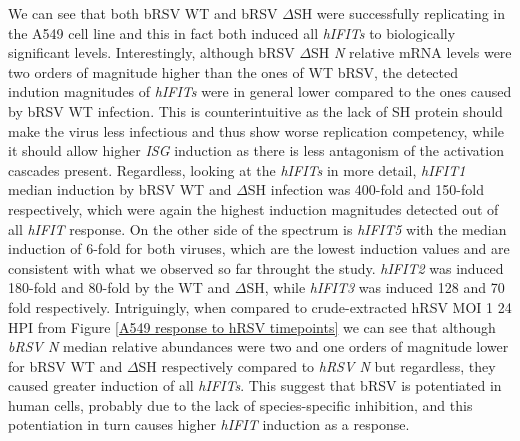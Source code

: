 We can see that both bRSV WT and bRSV \(\Delta\)SH were successfully replicating in the A549 cell line and this in fact both induced all \textit{hIFITs} to biologically significant levels. Interestingly, although bRSV \(\Delta\)SH \textit{N} relative mRNA levels were two orders of magnitude higher than the ones of WT bRSV, the detected indution magnitudes of \textit{hIFITs} were in general lower compared to the ones caused by bRSV WT infection. This is counterintuitive as the lack of SH protein should make the virus less infectious and thus show worse replication competency, while it should allow higher \textit{ISG} induction as there is less antagonism of the activation cascades present. Regardless, looking at the \textit{hIFITs} in more detail, \textit{hIFIT1} median induction by bRSV WT and \(\Delta\)SH infection was 400-fold and 150-fold respectively, which were again the highest induction magnitudes detected out of all \textit{hIFIT} response. On the other side of the spectrum is \textit{hIFIT5} with the median induction of 6-fold for both viruses, which are the lowest induction values and are consistent with what we observed so far throught the study. \textit{hIFIT2} was induced 180-fold and 80-fold by the WT and \(\Delta\)SH, while \textit{hIFIT3} was induced 128 and 70 fold respectively. Intriguingly, when compared to crude-extracted hRSV MOI 1 24 HPI from Figure \ref{A549 response to hRSV timepoints} we can see that although \textit{bRSV N} median relative abundances were two and one orders of magnitude lower for bRSV WT and \(\Delta\)SH respectively compared to \textit{hRSV N} but regardless, they caused greater induction of all \textit{hIFITs}. This suggest that bRSV is potentiated in human cells, probably due to the lack of species-specific inhibition, and this potentiation in turn causes higher \textit{hIFIT} induction as a response.

